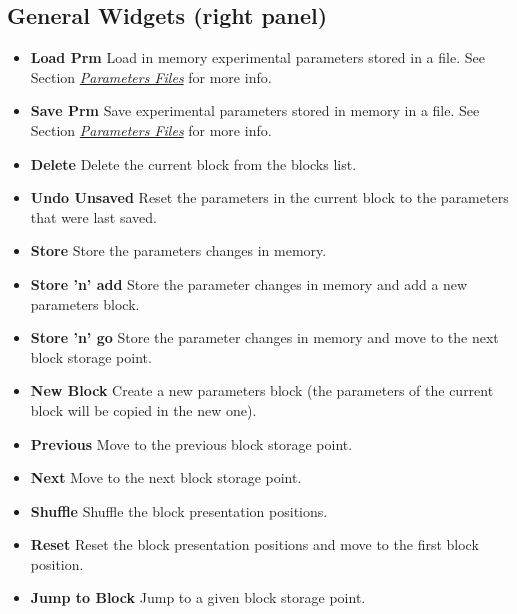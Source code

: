 \documentclass[a4paper,12pt,english]{sphinxmanual}
\begin{document}
\subsection{General Widgets (right panel)}
\label{graphical_user_interface:general-widgets-right-panel}\begin{itemize}
\item {} 
\textbf{Load Prm} Load in memory experimental parameters stored in a
 file. See Section {\hyperref[engine:sec-parameters-files]{\emph{Parameters Files}}} for more
info.

\item {} 
\textbf{Save Prm} Save experimental parameters stored in memory in a
 file. See Section {\hyperref[engine:sec-parameters-files]{\emph{Parameters Files}}} for more
info.

\item {} 
\textbf{Delete} Delete the current block from the blocks list.

\item {} 
\textbf{Undo Unsaved} Reset the parameters in the current block to the
parameters that were last saved.

\item {} 
\textbf{Store} Store the parameters changes in memory.

\item {} 
\textbf{Store ’n’ add} Store the parameter changes in memory and add a new
parameters block.

\item {} 
\textbf{Store ’n’ go} Store the parameter changes in memory and move to
the next block storage point.

\item {} 
\textbf{New Block} Create a new parameters block (the parameters of the
current block will be copied in the new one).

\item {} 
\textbf{Previous} Move to the previous block storage point.

\item {} 
\textbf{Next} Move to the next block storage point.

\item {} 
\textbf{Shuffle} Shuffle the block presentation positions.

\item {} 
\textbf{Reset} Reset the block presentation positions and move to the
first block position.

\item {} 
\textbf{Jump to Block} Jump to a given block storage point.


\end{itemize}
\end{document}
